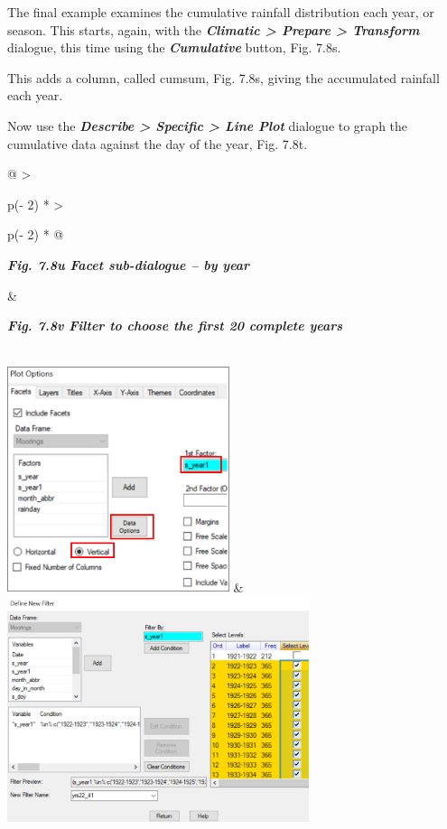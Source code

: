\documentclass[
  letterpaper,
  DIV=11,
  numbers=noendperiod]{scrreprt}
\begin{document}
The final example examines the cumulative rainfall distribution each
year, or season. This starts, again, with the \textbf{\emph{Climatic
\textgreater{} Prepare \textgreater{} Transform}} dialogue, this time
using the \textbf{\emph{Cumulative}} button, Fig. 7.8s.

This adds a column, called cumsum, Fig. 7.8s, giving the accumulated
rainfall each year.

Now use the \textbf{\emph{Describe \textgreater{} Specific
\textgreater{} Line Plot}} dialogue to graph the cumulative data against
the day of the year, Fig. 7.8t.

\begin{longtable}[]{@{}
  >{\raggedright\arraybackslash}p{(\columnwidth - 2\tabcolsep) * }
  >{\raggedright\arraybackslash}p{(\columnwidth - 2\tabcolsep) * }@{}}
\toprule\noalign{}
\begin{minipage}[b]{\linewidth}\raggedright
\textbf{\emph{Fig. 7.8u Facet sub-dialogue -- by year}}
\end{minipage} & \begin{minipage}[b]{\linewidth}\raggedright
\textbf{\emph{Fig. 7.8v Filter to choose the first 20 complete years}}
\end{minipage} \\
\midrule\noalign{}
\endhead
\bottomrule\noalign{}
\endlastfoot
\includegraphics[width=2.5613in,height=2.62596in]{figures/Fig7.8u.png} &
\includegraphics[width=3.48061in,height=2.59522in]{figures/Fig7.8v.png} \\
\end{longtable}
\end{document}
